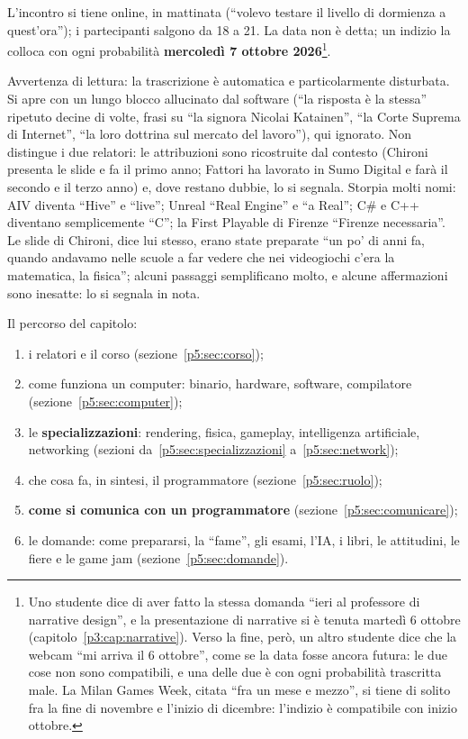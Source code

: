 L'incontro si tiene online, in mattinata (``volevo testare il livello di
dormienza a quest'ora''); i partecipanti salgono da 18 a 21. La data non è
detta; un indizio la colloca con ogni probabilità \textbf{mercoledì 7 ottobre
2026}\footnote{Uno studente dice di aver fatto la stessa domanda ``ieri al
professore di narrative design'', e la presentazione di narrative si è tenuta
martedì 6 ottobre (capitolo~\ref{p3:cap:narrative}). Verso la fine, però, un
altro studente dice che la webcam ``mi arriva il 6 ottobre'', come se la data
fosse ancora futura: le due cose non sono compatibili, e una delle due è con
ogni probabilità trascritta male. La Milan Games Week, citata ``fra un mese e
mezzo'', si tiene di solito fra la fine di novembre e l'inizio di dicembre:
l'indizio è compatibile con inizio ottobre.}.

Avvertenza di lettura: la trascrizione è automatica e particolarmente
disturbata. Si apre con un lungo blocco allucinato dal software (``la
risposta è la stessa'' ripetuto decine di volte, frasi su ``la signora
Nicolai Katainen'', ``la Corte Suprema di Internet'', ``la loro dottrina sul
mercato del lavoro''), qui ignorato. Non distingue i due relatori: le
attribuzioni sono ricostruite dal contesto (Chironi presenta le slide e fa il
primo anno; Fattori ha lavorato in Sumo Digital e farà il secondo e il terzo
anno) e, dove restano dubbie, lo si segnala. Storpia molti nomi: AIV diventa
``Hive'' e ``live''; Unreal ``Real Engine'' e ``a Real''; C\# e C++ diventano
semplicemente ``C''; la First Playable di Firenze ``Firenze necessaria''. Le
slide di Chironi, dice lui stesso, erano state preparate ``un po' di anni fa,
quando andavamo nelle scuole a far vedere che nei videogiochi c'era la
matematica, la fisica''; alcuni passaggi semplificano molto, e alcune
affermazioni sono inesatte: lo si segnala in nota.

Il percorso del capitolo:
\begin{enumerate}
  \item i relatori e il corso (sezione~\ref{p5:sec:corso});
  \item come funziona un computer: binario, hardware, software, compilatore
        (sezione~\ref{p5:sec:computer});
  \item le \textbf{specializzazioni}: rendering, fisica, gameplay,
        intelligenza artificiale, networking
        (sezioni da~\ref{p5:sec:specializzazioni} a~\ref{p5:sec:network});
  \item che cosa fa, in sintesi, il programmatore (sezione~\ref{p5:sec:ruolo});
  \item \textbf{come si comunica con un programmatore}
        (sezione~\ref{p5:sec:comunicare});
  \item le domande: come prepararsi, la ``fame'', gli esami, l'IA, i libri, le
        attitudini, le fiere e le game jam
        (sezione~\ref{p5:sec:domande}).
\end{enumerate}

